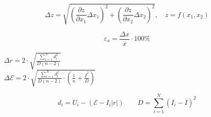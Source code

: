 \[
\Delta z = \sqrt{\left(\frac{\partial z}{\partial x_1} \Delta x_1\right)^2 + \left(\frac{\partial z}{\partial x_2} \Delta x_2\right)^2}, \quad z = f(x_1, x_2)
\]

\vspace{0.1cm}

\[
\varepsilon_x = \frac{\Delta x}{\overline{x}} \cdot 100\%
\]

\vspace{0.1cm}

\begin{center}
    $\Delta r = 2 \cdot \sqrt{\frac{\sum\limits_{i=1}^N d_i^2}{D (n-2)}}$ \\
    $\Delta \mathscr{E} = 2 \cdot \sqrt{\frac{\sum\limits_{i=1}^N d_i^2}{D (n-2)}\cdot \left(\frac{1}{n} + \frac{\overline{I}^2}{D}\right)}$
\end{center}

\[
d_i = U_i - (\mathscr{E} - I_i|r|) \quad \quad D = \sum\limits_{i=1}^N (I_i - \overline{I})^2
\]